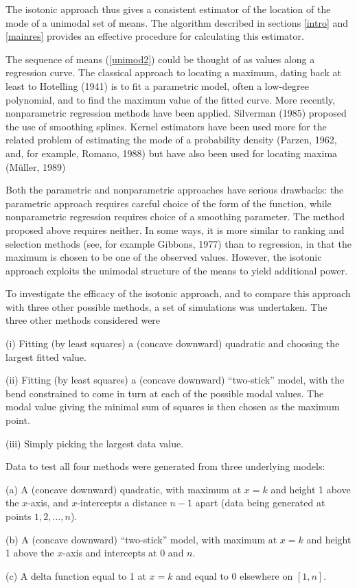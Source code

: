The isotonic approach thus gives a consistent estimator of
the location of the mode of a unimodal set of means.  The
algorithm described in sections \ref{intro} and
\ref{mainres} provides an effective procedure for
calculating this estimator.

The sequence of means (\ref{unimod2}) could be thought of
as values along a regression curve.  The classical approach
to locating a maximum, dating back at least to Hotelling (1941)
is to fit a parametric model, often a
low-degree polynomial, and to find the maximum value of the
fitted curve.  More recently, nonparametric regression
methods have been applied.  Silverman (1985)
proposed the use of smoothing splines.  Kernel estimators
have been used more for the related problem of estimating
the mode of a probability density (Parzen, 1962,
and, for example, Romano, 1988) but have also
been used for locating maxima (M\"{u}ller, 1989)

Both the parametric and nonparametric approaches have
serious drawbacks:  the parametric approach requires
careful choice of the form of the function, while
nonparametric regression requires choice of a smoothing
parameter.  The method proposed above requires neither.  In
some ways, it is more similar to ranking and selection
methods (see, for example Gibbons, 1977)
than to regression, in that the maximum is chosen to be one
of the observed values.  However, the isotonic approach
exploits the unimodal structure of the means to yield
additional power.

To investigate the efficacy of the isotonic approach, and
to compare this approach with three other possible methods,
a set of simulations was undertaken.  The three other
methods considered were  \begin{list}{}{} \item[(i)]
Fitting (by least squares) a (concave downward) quadratic
and choosing the largest fitted value.  \item[(ii)] Fitting
(by least squares) a (concave downward) ``two-stick''
model, with the bend constrained to come in turn at each of
the possible modal values.  The modal value giving the
minimal sum of squares is then chosen as the maximum
point.  \item[(iii)] Simply picking the largest data
value.  \end{list}

Data to test all four methods were generated from three underlying
models:  \begin{list}{}{} \item[(a)] A (concave downward) quadratic,
with maximum at $x = k$ and height 1 above the $x$-axis, and
$x$-intercepts a distance $n-1$ apart (data being generated at points
$1, 2, \ldots, n$).  \item[(b)] A (concave downward) ``two-stick''
model, with maximum at $x = k$ and height 1 above the $x$-axis and
intercepts at $0$ and $n$.  \item[(c)] A delta function equal to 1 at
$x = k$ and equal to 0 elsewhere on $[1,n]$.  \end{list}

